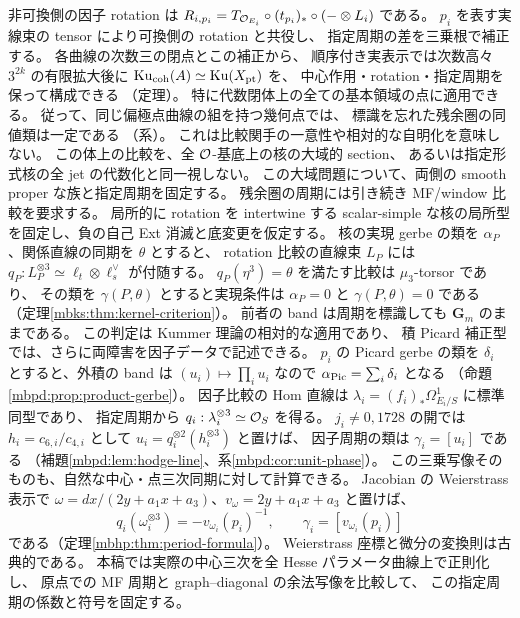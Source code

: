 非可換側の因子 rotation は
$R_{i,p_i}=T_{\mathcal O_{E_i}}\circ(t_{p_i})_*\circ(-\otimes L_i)$ である。
$p_i$ を表す実線束の tensor により可換側の rotation と共役し、
指定周期の差を三乗根で補正する。
各曲線の次数三の閉点とこの補正から、
順序付き実表示では次数高々 $3^{2k}$ の有限拡大後に
$\operatorname{Ku}_{\mathrm{coh}}(A)\simeq\operatorname{Ku}(X_{\mathrm{pt}})$ を、
中心作用・rotation・指定周期を保って構成できる
（定理）。
特に代数閉体上の全ての基本領域の点に適用できる。
従って、同じ偏極点曲線の組を持つ幾何点では、
標識を忘れた残余圏の同値類は一定である
（系）。
これは比較関手の一意性や相対的な自明化を意味しない。
この体上の比較を、全 $\mathcal O$-基底上の核の大域的 section、
あるいは指定形式核の全 jet の代数化と同一視しない。
この大域問題について、両側の smooth proper な族と指定周期を固定する。
残余圏の周期には引き続き MF/window 比較を要求する。
局所的に rotation を intertwine する
scalar-simple な核の局所型を固定し、負の自己 Ext 消滅と底変更を仮定する。
核の実現 gerbe の類を $\alpha_P$、関係直線の同期を $\theta$ とすると、
rotation 比較の直線束 $L_P$ には
$q_P:L_P^{\otimes3}\simeq\ell_t\otimes\ell_s^\vee$ が付随する。
$q_P(\eta^3)=\theta$ を満たす比較は $\mu_3$-torsor であり、
その類を $\gamma(P,\theta)$ とすると実現条件は
$\alpha_P=0$ と $\gamma(P,\theta)=0$ である
（定理\ref{mbks:thm:kernel-criterion}）。
前者の band は周期を標識しても $\mathbf G_m$ のままである。
この判定は Kummer 理論\cite{NFMStacksKummer}の相対的な適用であり、
積 Picard 補正型では、さらに両障害を因子データで記述できる。
$p_i$ の Picard gerbe の類を $\delta_i$ とすると、外積の band は
$(u_i)\mapsto\prod_i u_i$ なので $\alpha_{\rm Pic}=\sum_i\delta_i$ となる
（命題\ref{mbpd:prop:product-gerbe}）。
因子比較の Hom 直線は
$\lambda_i=(f_i)_*\Omega^1_{E_i/S}$ に標準同型であり、
指定周期から $q_i:\lambda_i^{\otimes3}\simeq\mathcal O_S$ を得る。
$j_i\ne0,1728$ の開では $h_i=c_{6,i}/c_{4,i}$ として
$u_i=q_i^{\otimes2}(h_i^{\otimes3})$ と置けば、
因子周期の類は $\gamma_i=[u_i]$ である
（補題\ref{mbpd:lem:hodge-line}、系\ref{mbpd:cor:unit-phase}）。
この三乗写像そのものも、自然な中心・点三次同期に対して計算できる。
Jacobian の Weierstrass 表示で
$\omega=dx/(2y+a_1x+a_3)$、$v_\omega=2y+a_1x+a_3$ と置けば、
\[
 q_i(\omega_i^{\otimes3})=-v_{\omega_i}(p_i)^{-1},\qquad
 \gamma_i=[v_{\omega_i}(p_i)]
\]
である（定理\ref{mbhp:thm:period-formula}）。
Weierstrass 座標と微分の変換則は古典的である\cite{NFMSilvermanArithmetic}。
本稿では実際の中心三次を全 Hesse パラメータ曲線上で正則化し、
原点での MF 周期と graph--diagonal の余法写像を比較して、
この指定周期の係数と符号を固定する。
